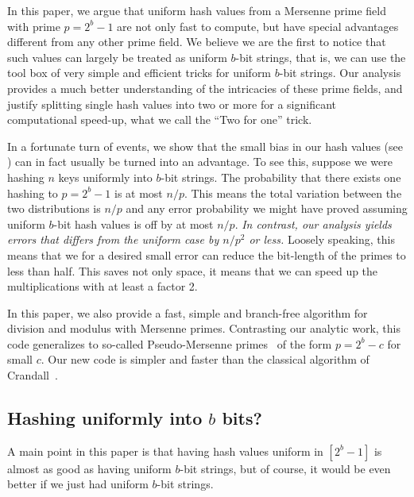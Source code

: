 In this paper, we argue that uniform hash values from a Mersenne prime
field with prime $p=2^b-1$ are not only fast to compute, but have
special advantages different from any other prime field.  We believe
we are the first to notice that such values can largely be treated as
uniform $b$-bit strings, that is, we can use the tool box of very
simple and efficient tricks for uniform $b$-bit strings.
Our analysis provides a much better understanding of the intricacies of these prime fields,
and justify splitting single hash values into two or more for a significant computational speed-up, what we call the ``Two for one'' trick.

In a fortunate turn of events, we show that the small bias in our hash values (see ) can in fact usually be turned into an advantage.
To see this, suppose we were hashing $n$ keys uniformly into $b$-bit strings.
The probability that there exists one hashing to $p=2^b-1$ is at most $n/p$.
This means the total variation between the two distributions is $n/p$ and any error probability we might have proved assuming uniform $b$-bit hash values is off by at most $n/p$.
\emph{In contrast, our analysis yields errors that differs from the uniform case by $n/p^2$ or less.}
Loosely speaking, this means that we for a desired small error can reduce
the bit-length of the primes to less than half. This saves not only
space, it means that we can speed up the multiplications
with at least a factor 2.

In this paper, we also provide a fast, simple and branch-free algorithm for
division and modulus with Mersenne primes. Contrasting our analytic
work, this code generalizes to so-called Pseudo-Mersenne
primes~\cite{van2014encyclopedia} of the form $p=2^b-c$ for small
$c$. Our new code is simpler and faster than the classical algorithm of
Crandall~\cite{crandall1992method}. 

\subsection{Hashing uniformly into \texorpdfstring{$b$}{b} bits?}\label{sec:b-bit?}
A main point in this paper is that having hash values uniform in $[2^b-1]$
is almost as good as having uniform $b$-bit strings, but of course,
it would be even better if we just had uniform $b$-bit strings.

